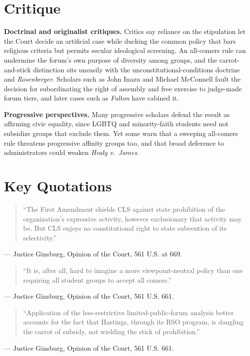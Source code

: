 \documentclass[12pt]{article}
\begin{document}
\section{Critique}

\textbf{Doctrinal and originalist critiques.} Critics say reliance on the stipulation let the Court decide an artificial case while ducking the common policy that bars religious criteria but permits secular ideological screening. An all-comers rule can undermine the forum's own purpose of diversity among groups, and the carrot-and-stick distinction sits uneasily with the unconstitutional-conditions doctrine and \textit{Rosenberger}. Scholars such as John Inazu and Michael McConnell fault the decision for subordinating the right of assembly and free exercise to judge-made forum tiers, and later cases such as \textit{Fulton} have cabined it.

\textbf{Progressive perspectives.} Many progressive scholars defend the result as affirming civic equality, since LGBTQ and minority-faith students need not subsidize groups that exclude them. Yet some warn that a sweeping all-comers rule threatens progressive affinity groups too, and that broad deference to administrators could weaken \textit{Healy v.\ James}.

\section{Key Quotations}

\begin{quote}
``The First Amendment shields CLS against state prohibition of the organization's expressive activity, however exclusionary that activity may be. But CLS enjoys no constitutional right to state subvention of its selectivity.''
\end{quote}
\noindent --- Justice Ginsburg, Opinion of the Court, 561 U.S. at 669.

\begin{quote}
``It is, after all, hard to imagine a more viewpoint-neutral policy than one requiring all student groups to accept all comers.''
\end{quote}
\noindent --- Justice Ginsburg, Opinion of the Court, 561 U.S. 661.

\begin{quote}
``Application of the less-restrictive limited-public-forum analysis better accounts for the fact that Hastings, through its RSO program, is dangling the carrot of subsidy, not wielding the stick of prohibition.''
\end{quote}
\noindent --- Justice Ginsburg, Opinion of the Court, 561 U.S. 661.
\end{document}
